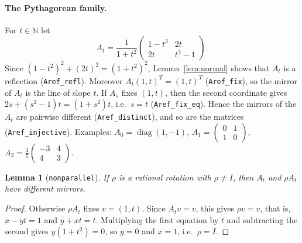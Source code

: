 \documentclass[11pt]{article}
\newtheorem{lemma}[theorem]{Lemma}
\theoremstyle{definition}
\theoremstyle{remark}
\newcommand{\N}{\mathbb N}
\begin{document}
\paragraph{The Pythagorean family.} For $t\in\N$ let
\[
A_t=\frac1{1+t^2}\begin{pmatrix}1-t^2&2t\\ 2t&t^2-1\end{pmatrix}.
\]
Since $(1-t^2)^2+(2t)^2=(1+t^2)^2$, Lemma~\ref{lem:normal} shows that $A_t$ is a reflection
(\texttt{Aref\_refl}). Moreover $A_t(1,t)^{T}=(1,t)^{T}$ (\texttt{Aref\_fix}), so the mirror of
$A_t$ is the line of slope $t$. If $A_s$ fixes $(1,t)$, then the second coordinate gives
$2s+(s^2-1)t=(1+s^2)t$, i.e.\ $s=t$ (\texttt{Aref\_fix\_eq}). Hence the mirrors of the $A_t$ are
pairwise different (\texttt{Aref\_distinct}), and so are the matrices (\texttt{Aref\_injective}).
Examples: $A_0=\operatorname{diag}(1,-1)$, $A_1=\left(\begin{smallmatrix}0&1\\
1&0\end{smallmatrix}\right)$, $A_2=\frac15\left(\begin{smallmatrix}-3&4\\
4&3\end{smallmatrix}\right)$.

\begin{lemma}[\texttt{nonparallel}]\label{lem:nonpar}
If $\rho$ is a rational rotation with $\rho\neq I$, then $A_t$ and $\rho A_t$ have different
mirrors.
\end{lemma}
\begin{proof}
Otherwise $\rho A_t$ fixes $v=(1,t)$. Since $A_tv=v$, this gives $\rho v=v$, that is,
$x-yt=1$ and $y+xt=t$. Multiplying the first equation by $t$ and subtracting the second gives
$y(1+t^2)=0$, so $y=0$ and $x=1$, i.e.\ $\rho=I$.
\end{proof}
\end{document}
